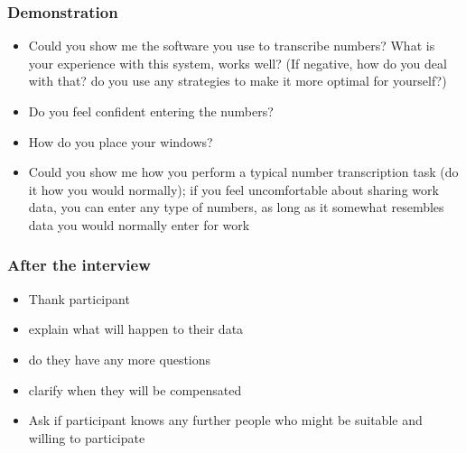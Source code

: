 \subsubsection{Demonstration}
\begin{itemize}
\item Could you show me the software you use to transcribe numbers?
What is your experience with this system, works well?
(If negative, how do you deal with that? do you use any strategies to make it more optimal for yourself?)
\item Do you feel confident entering the numbers?
\item How do you place your windows?
\item Could you show me how you perform a typical number transcription task (do it how you would normally); if you feel uncomfortable about sharing work data, you can enter any type of numbers, as long as it somewhat resembles data you would normally enter for work
\end{itemize}
\subsubsection{After the interview}
\begin{itemize}
\item Thank participant
\item explain what will happen to their data
\item do they have any more questions
\item clarify when they will be compensated
\item Ask if participant knows any further people who might be suitable and willing to participate
\end{itemize}
